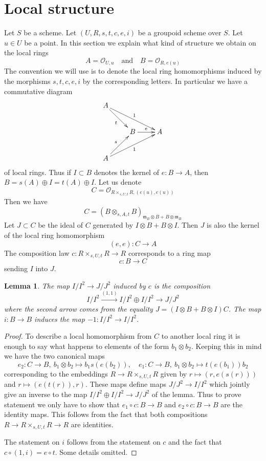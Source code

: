 \documentclass{stacks-project}
\theoremstyle{plain}
\newtheorem{lemma}[subsection]{Lemma}
\theoremstyle{definition}
\theoremstyle{remark}
\numberwithin{equation}{subsection}
\begin{document}
\section{Local structure}
\label{section-local}

\noindent
Let $S$ be a scheme.
Let $(U, R, s, t, c, e, i)$ be a groupoid scheme over $S$.
Let $u \in U$ be a point. In this section we explain what
kind of structure we obtain on the local rings
$$
A = \mathcal{O}_{U, u}
\quad\text{and}\quad
B = \mathcal{O}_{R, e(u)}
$$
The convention we will use is to denote the local ring homomorphisms
induced by the morphisms $s, t, c, e, i$ by the corresponding letters.
In particular we have a commutative diagram
$$
\xymatrix{
A \ar[rd]_t \ar[rrd]^1 \\
& B \ar[r]^e & A \\
A \ar[ru]^s \ar[rru]_1
}
$$
of local rings. Thus if $I \subset B$ denotes the kernel of $e : B \to A$,
then $B = s(A) \oplus I = t(A) \oplus I$. Let us denote
$$
C = \mathcal{O}_{R \times_{s, U, t} R, (e(u), e(u))}
$$
Then we have
$$
C = (B \otimes_{s, A, t} B)_{\mathfrak m_B \otimes B + B \otimes \mathfrak m_B}
$$
Let $J \subset C$ be the ideal of $C$ generated by $I \otimes B + B \otimes I$.
Then $J$ is also the kernel of the local ring homomorphism
$$
(e, e) : C \longrightarrow A
$$
The composition law $c : R \times_{s, U, t} R \to R$ corresponds to a
ring map
$$
c : B \longrightarrow C
$$
sending $I$ into $J$.

\begin{lemma}
\label{lemma-first-order-structure-c}
The map $I/I^2 \to J/J^2$ induced by $c$ is the composition
$$
I/I^2 \xrightarrow{(1, 1)} I/I^2 \oplus I/I^2 \to J/J^2
$$
where the second arrow comes from the equality
$J = (I \otimes B + B \otimes I)C$.
The map $i : B \to B$ induces the map $-1 : I/I^2 \to I/I^2$.
\end{lemma}

\begin{proof}
To describe a local homomorphism from $C$ to another local ring
it is enough to say what happens to elements of the form
$b_1 \otimes b_2$. Keeping this in mind we have the two canonical maps
$$
e_2 : C \to B,\ b_1 \otimes b_2 \mapsto b_1s(e(b_2)),\quad
e_1 : C \to B,\ b_1 \otimes b_2 \mapsto t(e(b_1))b_2
$$
corresponding to the embeddings
$R \to R \times_{s, U, t} R$ given by
$r \mapsto (r, e(s(r)))$ and $r \mapsto (e(t(r)), r)$.
These maps define maps $J/J^2 \to I/I^2$ which jointly
give an inverse to the map $I/I^2 \oplus I/I^2 \to J/J^2$
of the lemma. Thus to prove statement we only have to show
that $e_1 \circ c : B \to B$ and $e_2 \circ c : B \to B$
are the identity maps. This follows from the fact that both
compositions $R \to R \times_{s, U, t} R \to R$ are identities.

\medskip\noindent
The statement on $i$ follows from the statement on $c$ and the
fact that $c \circ (1, i) = e \circ t$. Some details omitted.
\end{proof}
\end{document}
